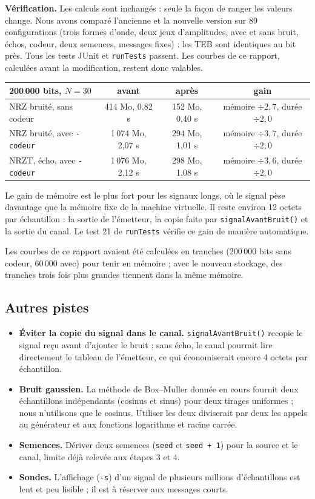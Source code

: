 \documentclass[11pt,a4paper]{article}
\begin{document}
\textbf{Vérification.} Les calculs sont inchangés : seule la façon de ranger les valeurs change. Nous avons comparé l'ancienne et la nouvelle version sur 89 configurations (trois formes d'onde, deux jeux d'amplitudes, avec et sans bruit, échos, codeur, deux semences, messages fixes) : les TEB sont identiques au bit près. Tous les tests JUnit et \texttt{runTests} passent. Les courbes de ce rapport, calculées avant la modification, restent donc valables.

\begin{center}\begin{tabular}{lccc}\toprule
200\,000 bits, $N = 30$ & avant & après & gain\\\midrule
NRZ bruité, sans codeur & 414 Mo, 0,82 s & 152 Mo, 0,40 s & mémoire $\div 2{,}7$, durée $\div 2{,}0$\\
NRZ bruité, avec \texttt{-codeur} & 1\,074 Mo, 2,07 s & 294 Mo, 1,01 s & mémoire $\div 3{,}7$, durée $\div 2{,}0$\\
NRZT, écho, avec \texttt{-codeur} & 1\,076 Mo, 2,12 s & 298 Mo, 1,08 s & mémoire $\div 3{,}6$, durée $\div 2{,}0$\\\bottomrule
\end{tabular}\end{center}
Le gain de mémoire est le plus fort pour les signaux longs, où le signal pèse davantage que la mémoire fixe de la machine virtuelle. Il reste environ 12 octets par échantillon : la sortie de l'émetteur, la copie faite par \texttt{signalAvantBruit()} et la sortie du canal. Le test 21 de \texttt{runTests} vérifie ce gain de manière automatique.

Les courbes de ce rapport avaient été calculées en tranches (200\,000 bits sans codeur, 60\,000 avec) pour tenir en mémoire ; avec le nouveau stockage, des tranches trois fois plus grandes tiennent dans la même mémoire.

\subsection{Autres pistes}
\begin{itemize}
  \item \textbf{Éviter la copie du signal dans le canal.} \texttt{signalAvantBruit()} recopie le signal reçu avant d'ajouter le bruit ; sans écho, le canal pourrait lire directement le tableau de l'émetteur, ce qui économiserait encore 4 octets par échantillon.
  \item \textbf{Bruit gaussien.} La méthode de Box--Muller donnée en cours fournit deux échantillons indépendants (cosinus et sinus) pour deux tirages uniformes ; nous n'utilisons que le cosinus. Utiliser les deux diviserait par deux les appels au générateur et aux fonctions logarithme et racine carrée.
  \item \textbf{Semences.} Dériver deux semences (\texttt{seed} et \texttt{seed + 1}) pour la source et le canal, limite déjà relevée aux étapes 3 et 4.
  \item \textbf{Sondes.} L'affichage (\texttt{-s}) d'un signal de plusieurs millions d'échantillons est lent et peu lisible ; il est à réserver aux messages courts.
\end{itemize}
\end{document}
